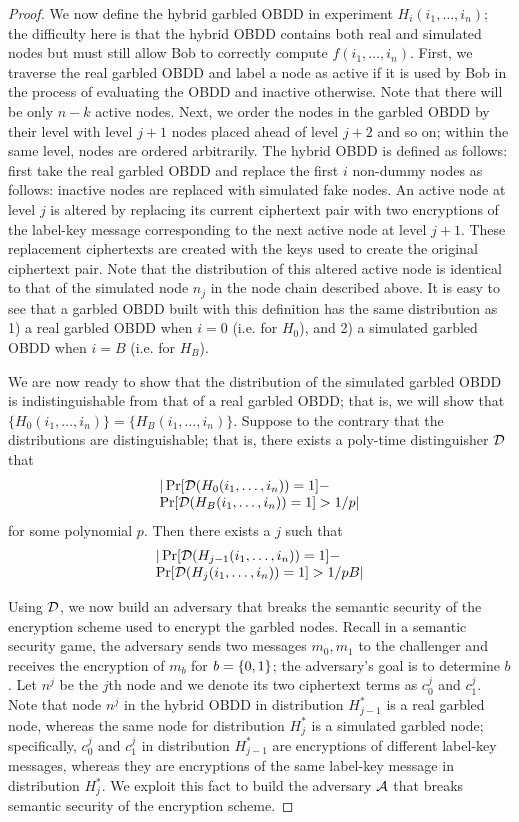 \begin{proof}
We now define the hybrid garbled OBDD in experiment
$H_i(i_1,\ldots,i_n)$; the difficulty here is that the hybrid OBDD
contains both real and simulated nodes but must still allow Bob to
correctly compute $f(i_1,\ldots,i_n)$. First, we traverse the real
garbled OBDD and label a node as active if it is used by Bob in the
process of evaluating the OBDD and inactive otherwise. Note that there
will be only $n-k$ active nodes. Next, we order the nodes in the
garbled OBDD by their level with level $j+1$ nodes placed ahead of
level $j+2$ and so on; within the same level, nodes are ordered
arbitrarily. The hybrid OBDD is defined as follows: first take the real
garbled OBDD and replace the first $i$ non-dummy nodes as follows:
inactive nodes are replaced with simulated fake nodes. An active node
at level $j$ is altered by replacing its current ciphertext pair with
two encryptions of the label-key message corresponding to the next
active node at level $j+1$. These replacement ciphertexts are created
with the keys used to create the original ciphertext pair. Note that
the distribution of this altered active node is identical to that of
the simulated node $n_j$ in the node chain described above. It is easy
to see that a garbled OBDD built with this definition has the same
distribution as 1) a real garbled OBDD when $i=0$ (i.e. for $H_0$), and
2) a simulated garbled OBDD when $i=B$ (i.e. for $H_B$).

We are now ready to show that the distribution of the simulated
garbled OBDD is indistinguishable from that of a real garbled OBDD; that
is, we will show that
$\{H_0(i_1,\ldots,i_n)\}=\{H_{B}(i_1,\ldots,i_n)\}$. Suppose to the
contrary that the distributions are distinguishable; that is, there
exists a poly-time distinguisher ${\mathcal{D}}$ that 
\[
\begin{array}{l}
\vert \Pr[{\mathcal{D}}(H_0(i_1,\ldots,i_n))=1] - \\
\Pr[{\mathcal{D}}(H_{B}(i_1,\ldots,i_n))=1]>1/p\vert
\end{array}
\]
 for some polynomial
$p$. Then there exists a $j$ such that 
\[
\begin{array}{l}
\vert
\Pr[{\mathcal{D}}(H_{j-1}(i_1,\ldots,i_n))=1] - \\
\Pr[{\mathcal{D}}(H_{j}(i_1,\ldots,i_n))=1]>1/pB\vert
\end{array}
\]

Using ${\mathcal{D}}$, we now build an adversary that breaks the semantic
security of the encryption scheme used to encrypt the garbled
nodes. Recall in a semantic security game, the adversary sends two
messages $m_0,m_1$ to the challenger and receives the encryption of
$m_b$ for $b=\{0,1\}$; the adversary's goal is to determine $b$. Let
$n^j$ be the $j$th node and we denote its two ciphertext terms as
$c^{j}_0$ and $c^{j}_1$. Note that node $n^j$ in the hybrid OBDD in
distribution $H^*_{j-1}$ is a real garbled node, whereas the same node
for distribution $H^*_{j}$ is a simulated garbled node; specifically,
$c^{j}_0$ and $c^{j}_1$ in distribution $H^*_{j-1}$ are encryptions of
different label-key messages, whereas they are encryptions of the same
label-key message in distribution $H^*_{j}$. We exploit this fact to
build the adversary ${\mathcal{A}}$ that breaks semantic security of the
encryption scheme.


\end{proof}
